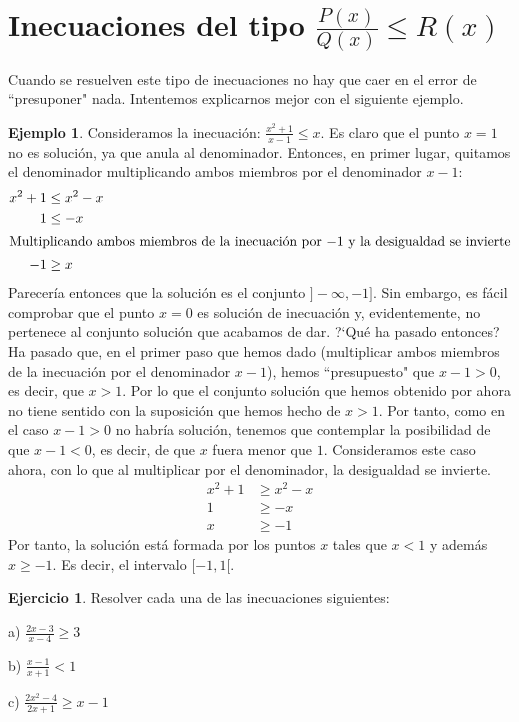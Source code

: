 \documentclass[13pt]{scrartcl}
\theoremstyle{definition}
\newtheorem{ejemplo}{Ejemplo}
\newtheorem{ejercicio}{Ejercicio}
\begin{document}
\section{Inecuaciones del tipo $\frac{P(x)}{Q(x)} \le R(x)$}
Cuando se resuelven este tipo de inecuaciones no hay que caer en el error de ``presuponer" 
nada. Intentemos explicarnos mejor con el siguiente ejemplo.
\begin{ejemplo} Consideramos la inecuación: $\frac{x^2+1}{x-1} \le x$. Es claro que el 
punto $x=1$ no es solución, ya que anula al denominador. Entonces, en primer lugar, 
quitamos el denominador multiplicando ambos miembros por el denominador $x-1$:
\begin{align*}
x^2+1 & \le x^2-x \\
1 & \le -x \\
\intertext{Multiplicando ambos miembros de la inecuación por $-1$ y la desigualdad  se invierte}
-1 & \ge x
\end{align*}
Parecería entonces que la solución es el conjunto $]-\infty,-1] $. Sin embargo, es fácil comprobar que 
el punto $x=0$  es solución de inecuación y,  evidentemente, no pertenece al conjunto 
solución que acabamos de dar. ?`Qué ha pasado entonces? Ha pasado que, en el primer 
paso que hemos dado (multiplicar ambos miembros de la inecuación por el denominador 
$x-1$), hemos ``presupuesto" que $x-1>0$, es decir, que $x>1$. Por lo que el 
conjunto solución que hemos obtenido por ahora no tiene sentido con la suposición 
que hemos hecho de $x>1$. Por tanto, como en el caso $x-1>0$ no habría solución,  
tenemos que contemplar la posibilidad de que $x-1<0$, es decir, de que $x$ fuera menor 
que $1$. Consideramos este caso ahora, con lo que al multiplicar por el denominador, la 
desigualdad se invierte.
\begin{align*}
x^2+1 & \ge x^2-x \\
1 & \ge -x \\
x & \ge -1
\end{align*}
Por tanto, la solución está formada por los puntos $x$ tales que  $x<1$ y además $x \ge -1$. Es decir, el intervalo $[-1,1[$.
\end{ejemplo}

\pagebreak[4]

\begin{ejercicio} Resolver cada una de las inecuaciones siguientes:
\begin{multicols}{3}
\item[a)] $\frac{2x-3}{x-4} \ge 3$
\item[b)] $\frac{x-1}{x+1} <1$
\item[c)] $\frac{2x^2-4}{2x+1} \ge x-1$
\end{multicols}
\end{ejercicio}
\end{document}

